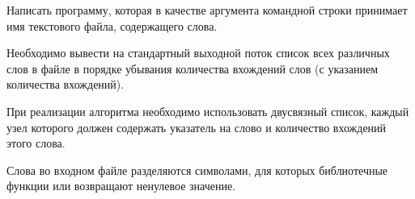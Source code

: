 

Написать программу, которая в качестве аргумента командной строки
принимает имя текстового файла, содержащего слова.

Необходимо
вывести на стандартный выходной поток список всех различных слов в
файле в порядке убывания количества вхождений слов (с указанием
количества вхождений).

При реализации алгоритма необходимо
использовать двусвязный список, каждый узел которого должен
содержать указатель на слово и количество вхождений этого слова.

Слова
во входном файле разделяются символами, для которых библиотечные
функции  или  возвращают ненулевое значение.
